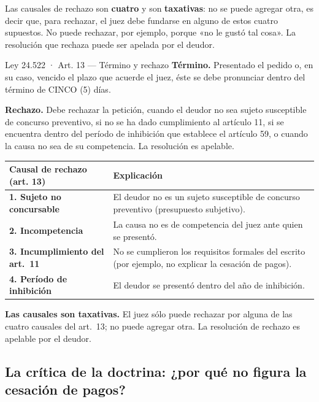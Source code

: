 \documentclass[12pt,oneside]{book}
\begin{document}
Las causales de rechazo son \textbf{cuatro} y son \textbf{taxativas}: no se puede agregar otra, es decir que, para rechazar, el juez debe fundarse en alguno de estos cuatro supuestos. No puede rechazar, por ejemplo, porque «no le gustó tal cosa». La resolución que rechaza puede ser apelada por el deudor.

\begin{norma}{Ley 24.522 · Art. 13 — Término y rechazo}
\textbf{Término.} Presentado el pedido o, en su caso, vencido el plazo que acuerde el juez, éste se debe pronunciar dentro del término de CINCO (5) días.

\textbf{Rechazo.} Debe rechazar la petición, cuando el deudor no sea sujeto susceptible de concurso preventivo, si no se ha dado cumplimiento al artículo 11, si se encuentra dentro del período de inhibición que establece el artículo 59, o cuando la causa no sea de su competencia. La resolución es apelable.
\end{norma}

\begingroup
\small
\renewcommand{\arraystretch}{1.25}
\begin{tabularx}{\textwidth}{>{\raggedright\arraybackslash}p{} Y}
\toprule
\textbf{Causal de rechazo (art. 13)} & \textbf{Explicación} \\
\midrule
\textbf{1. Sujeto no concursable} & El deudor no es un sujeto susceptible de concurso preventivo (presupuesto subjetivo). \\
\textbf{2. Incompetencia} & La causa no es de competencia del juez ante quien se presentó. \\
\textbf{3. Incumplimiento del art.~11} & No se cumplieron los requisitos formales del escrito (por ejemplo, no explicar la cesación de pagos). \\
\textbf{4. Período de inhibición} & El deudor se presentó dentro del año de inhibición. \\
\bottomrule
\end{tabularx}
\endgroup

\begin{important}
\textbf{Las causales son taxativas.} El juez sólo puede rechazar por alguna de las cuatro causales del art.~13; no puede agregar otra. La resolución de rechazo es apelable por el deudor.
\end{important}

\subsection{La crítica de la doctrina: ¿por qué no figura la cesación de pagos?}
\end{document}
